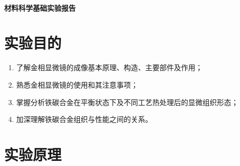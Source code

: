 \documentclass[a4paper,utf8]{article}
\begin{document}
\begin{center}
    {\mbox{}\\[7em]\bfseries\songti%
    材料科学基础实验报告}\\[34mm]
\end{center}
\newpage
\section{实验目的}
\begin{enumerate}
    \item 了解金相显微镜的成像基本原理、构造、主要部件及作用；
    \item 熟悉金相显微镜的使用和其注意事项；
    \item 掌握分析铁碳合金在平衡状态下及不同工艺热处理后的显微组织形态；
    \item 加深理解铁碳合金组织与性能之间的关系。
\end{enumerate}

\section{实验原理}%
\end{document}
